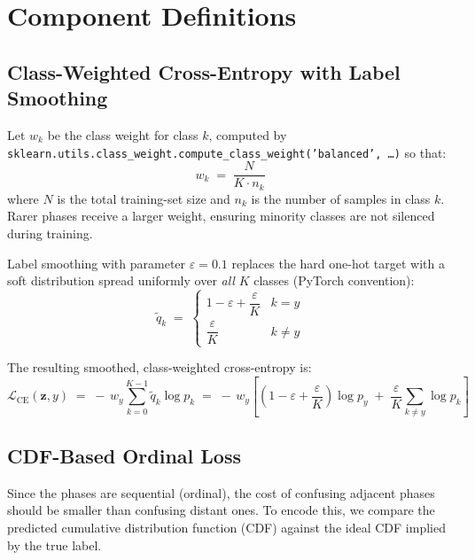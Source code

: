 \documentclass[12pt, a4paper]{article}
\theoremstyle{definition}
\theoremstyle{remark}
\begin{document}
\section{Component Definitions}

\subsection{Class-Weighted Cross-Entropy with Label Smoothing}

Let $w_k$ be the class weight for class $k$, computed by
\texttt{sklearn.utils.class\_weight.compute\_class\_weight('balanced', \ldots)}
so that:
\begin{equation}
    w_k \;=\; \frac{N}{K \cdot n_k}
    \label{eq:classweight}
\end{equation}
where $N$ is the total training-set size and $n_k$ is the number of samples
in class $k$. Rarer phases receive a larger weight, ensuring minority classes
are not silenced during training.

Label smoothing with parameter $\varepsilon = 0.1$ replaces the hard one-hot
target with a soft distribution spread uniformly over \emph{all} $K$ classes
(PyTorch convention):
\begin{equation}
    \tilde{q}_k \;=\;
    \begin{cases}
        1 - \varepsilon + \dfrac{\varepsilon}{K} & k = y \\[6pt]
        \dfrac{\varepsilon}{K} & k \neq y
    \end{cases}
    \label{eq:smooth}
\end{equation}

The resulting smoothed, class-weighted cross-entropy is:
\begin{equation}
    \mathcal{L}_{\mathrm{CE}}(\mathbf{z}, y)
    \;=\;
    -\,w_y \sum_{k=0}^{K-1} \tilde{q}_k \log p_k
    \;=\;
    -\,w_y\!\left[
        \!\left(1 - \varepsilon + \frac{\varepsilon}{K}\right)\log p_y
        \;+\;
        \frac{\varepsilon}{K}\sum_{k \neq y}\log p_k
    \right]
    \label{eq:ce}
\end{equation}

\subsection{CDF-Based Ordinal Loss}

Since the phases are sequential (ordinal), the cost of confusing adjacent
phases should be smaller than confusing distant ones. To encode this, we
compare the predicted cumulative distribution function (CDF) against the
ideal CDF implied by the true label.
\end{document}
